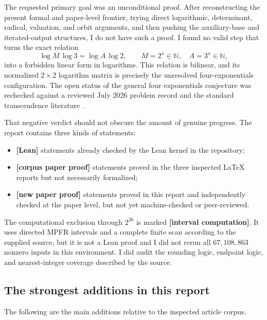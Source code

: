 \documentclass[11pt,oneside]{article}
\theoremstyle{definition}
\theoremstyle{remark}
\newcommand{\N}{\mathbb N}
\newcommand{\statuslean}{\textcolor{LeanBlue}{\textbf{[Lean]}}}
\newcommand{\statuspaper}{\textcolor{PaperGreen}{\textbf{[corpus paper proof]}}}
\newcommand{\statusnew}{\textcolor{NewViolet}{\textbf{[new paper proof]}}}
\newcommand{\statuscomp}{\textcolor{ComputeOrange}{\textbf{[interval computation]}}}
\begin{document}
The requested primary goal was an unconditional proof.  After reconstructing the present
formal and paper-level frontier, trying direct logarithmic, determinant, radical, valuation,
and orbit arguments, and then pushing the auxiliary-base and iterated-output structures, I do
not have such a proof.  I found no valid step that turns the exact relation
\[
  \log M\,\log 3=\log A\,\log 2,
  \qquad M=2^x\in\N,\quad A=3^x\in\N,
\]
into a forbidden linear form in logarithms.  This relation is bilinear, and its normalized
$2\times2$ logarithm matrix is precisely the unresolved four-exponentials configuration.
The open status of the general four exponentials conjecture was rechecked against a reviewed
July 2026 problem record and the standard transcendence literature~\cite{TheoremDBFourExp,Waldschmidt2003,Waldschmidt2005}.

That negative verdict should not obscure the amount of genuine progress.  The report contains
three kinds of statements:

\begin{itemize}
\item \statuslean{} statements already checked by the Lean kernel in the repository;
\item \statuspaper{} statements proved in the three inspected LaTeX reports but not necessarily
      formalized;
\item \statusnew{} statements proved in this report and independently checked at the paper level,
      but not yet machine-checked or peer-reviewed.
\end{itemize}

The computational exclusion through $2^{26}$ is marked \statuscomp.  It uses directed MPFR
intervals and a complete finite scan according to the supplied source, but it is not a Lean
proof and I did not rerun all $67{,}108{,}863$ nonzero inputs in this environment.  I did audit
the rounding logic, endpoint logic, and nearest-integer coverage described by the source.

\subsection{The strongest additions in this report}

The following are the main additions relative to the inspected article corpus.
\end{document}
